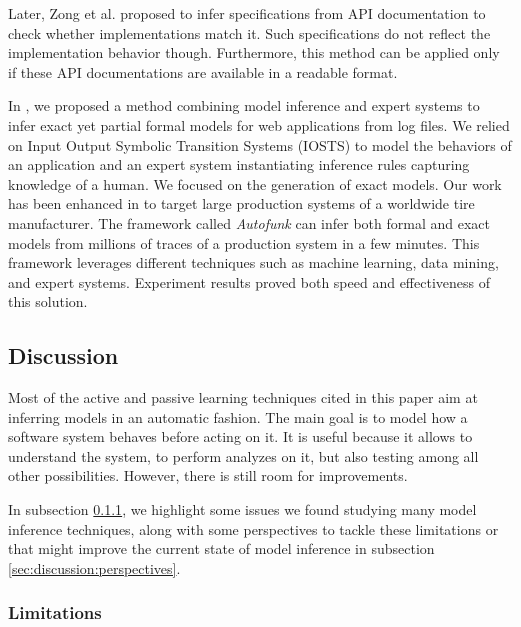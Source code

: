 Later, Zong et al. \cite{ZhongZXM11} proposed to infer
specifications from API documentation to check whether
implementations match it.  Such specifications do not reflect the
implementation behavior though. Furthermore, this method can be
applied only if these API documentations are available in a
readable format.


In \cite{DBLP:conf/soict/DurandS14}, we proposed a method
combining model inference and expert systems to infer exact yet
partial formal models for web applications from log files. We
relied on Input Output Symbolic Transition Systems (IOSTS)
\cite{FTW05} to model the behaviors of an application and an
expert system instantiating inference rules capturing knowledge
of a human. We focused on the generation of exact models.  Our
work has been enhanced in \cite{DBLP:conf/debs/SalvaD15} to
target large production systems of a worldwide tire
manufacturer. The framework called \textit{Autofunk} can infer
both formal and exact models from millions of traces of a
production system in a few minutes. This framework leverages
different techniques such as machine learning, data mining, and
expert systems. Experiment results proved both speed and
effectiveness of this solution.


\subsection{Discussion}
\label{sec:discussion}

Most of the active and passive learning techniques cited in this
paper aim at inferring models in an automatic fashion. The main
goal is to model how a software system behaves before acting on
it. It is useful because it allows to understand the system, to
perform analyzes on it, but also testing among all other
possibilities.  However, there is still room for improvements.

In subsection \ref{sec:discussion:limitations}, we highlight some
issues we found studying many model inference techniques, along
with some perspectives to tackle these limitations or that might
improve the current state of model inference in subsection
\ref{sec:discussion:perspectives}.


\subsubsection{Limitations}
\label{sec:discussion:limitations}

